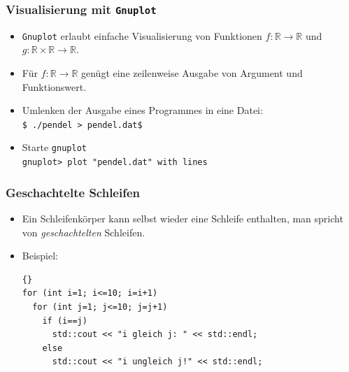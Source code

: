 \begin{frame}
\frametitle{Visualisierung mit \lstinline{Gnuplot}}
\begin{itemize}
\item \lstinline{Gnuplot} erlaubt einfache Visualisierung von Funktionen
  $f:\mathbb{R}\to\mathbb{R}$ und
  $g:\mathbb{R}\times\mathbb{R}\to\mathbb{R}$.
\item Für  $f:\mathbb{R}\to\mathbb{R}$ genügt eine zeilenweise Ausgabe
  von Argument und Funktionswert.
\item Umlenken der Ausgabe eines Programmes in eine Datei:\\
\lstinline{$ ./pendel > pendel.dat$}
\item Starte \lstinline{gnuplot}\\
\lstinline{gnuplot> plot "pendel.dat" with lines}
\end{itemize}
\end{frame}


\begin{frame}[fragile]
\frametitle{Geschachtelte Schleifen}
\begin{itemize}
\item Ein Schleifenkörper kann selbst wieder eine Schleife enthalten,
  man spricht von \textsl{geschachtelten} Schleifen.
\item Beispiel:
{\scriptsize\begin{lstlisting}{}
for (int i=1; i<=10; i=i+1)
  for (int j=1; j<=10; j=j+1)
    if (i==j)
      std::cout << "i gleich j: " << std::endl;
    else
      std::cout << "i ungleich j!" << std::endl;
\end{lstlisting}}
\end{itemize}
\end{frame}

